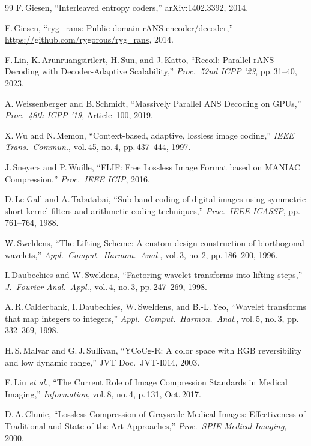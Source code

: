 \documentclass[journal]{IEEEtran}
\begin{document}
\begin{thebibliography}{99}
F.\,Giesen, ``Interleaved entropy coders,'' arXiv:1402.3392, 2014.

F.\,Giesen, ``ryg\_rans: Public domain rANS encoder/decoder,''
\url{https://github.com/rygorous/ryg_rans}, 2014.

F.\,Lin, K.\,Arunruangsirilert, H.\,Sun, and J.\,Katto,
``Recoil: Parallel rANS Decoding with Decoder-Adaptive Scalability,''
\textit{Proc.\ 52nd ICPP '23}, pp.\,31--40, 2023.

A.\,Weissenberger and B.\,Schmidt,
``Massively Parallel ANS Decoding on GPUs,''
\textit{Proc.\ 48th ICPP '19}, Article~100, 2019.

X.\,Wu and N.\,Memon,
``Context-based, adaptive, lossless image coding,''
\textit{IEEE Trans.\ Commun.}, vol.\,45, no.\,4, pp.\,437--444, 1997.

J.\,Sneyers and P.\,Wuille,
``FLIF: Free Lossless Image Format based on MANIAC Compression,''
\textit{Proc.\ IEEE ICIP}, 2016.

D.\,Le Gall and A.\,Tabatabai,
``Sub-band coding of digital images using symmetric short kernel filters and
arithmetic coding techniques,'' \textit{Proc.\ IEEE ICASSP}, pp.\,761--764, 1988.

W.\,Sweldens,
``The Lifting Scheme: A custom-design construction of biorthogonal wavelets,''
\textit{Appl.\ Comput.\ Harmon.\ Anal.}, vol.\,3, no.\,2, pp.\,186--200, 1996.

I.\,Daubechies and W.\,Sweldens,
``Factoring wavelet transforms into lifting steps,''
\textit{J.\ Fourier Anal.\ Appl.}, vol.\,4, no.\,3, pp.\,247--269, 1998.

A.\,R.\,Calderbank, I.\,Daubechies, W.\,Sweldens, and B.-L.\,Yeo,
``Wavelet transforms that map integers to integers,''
\textit{Appl.\ Comput.\ Harmon.\ Anal.}, vol.\,5, no.\,3, pp.\,332--369, 1998.

H.\,S.\,Malvar and G.\,J.\,Sullivan,
``YCoCg-R: A color space with RGB reversibility and low dynamic range,''
JVT Doc.\ JVT-I014, 2003.

F.\,Liu \textit{et al.},
``The Current Role of Image Compression Standards in Medical Imaging,''
\textit{Information}, vol.\,8, no.\,4, p.\,131, Oct.\,2017.

D.\,A.\,Clunie,
``Lossless Compression of Grayscale Medical Images: Effectiveness of
Traditional and State-of-the-Art Approaches,''
\textit{Proc.\ SPIE Medical Imaging}, 2000.


\end{thebibliography}
\end{document}
